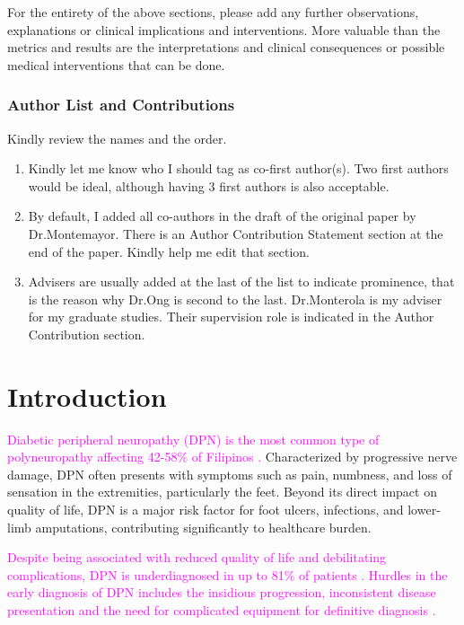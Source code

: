 \documentclass[fleqn,10pt]{wlscirep}
\begin{document}
For the entirety of the above  sections, please add any further observations, explanations or clinical implications and interventions. More valuable than the metrics and results are the interpretations and clinical consequences or possible medical interventions that can be done.

\subsubsection*{Author List and Contributions}
Kindly review the names and the order. 
\begin{enumerate}
    \item Kindly let me know who I should tag as co-first author(s). Two first authors would be ideal, although having 3 first authors is also acceptable. 
    \item By default, I added all co-authors in the draft of the original paper by Dr.Montemayor. There is an Author Contribution Statement section at the end of the paper. Kindly help me edit that section.
    \item Advisers are usually added at the last of the list to indicate prominence, that is the reason why Dr.Ong is second to the last.  Dr.Monterola is my adviser for my graduate studies. Their supervision role is indicated in the Author Contribution section.
\end{enumerate}

\section*{Introduction}
\textcolor{magenta}{Diabetic peripheral neuropathy (DPN) is the most common type of polyneuropathy affecting 42-58\% of Filipinos \cite{ropper2019adams, araneta2006hyperglycemia, dagang2016validation}.
}
Characterized by progressive nerve damage, DPN often presents with symptoms such as pain, numbness, and loss of sensation in the extremities, particularly the feet. Beyond its direct impact on quality of life, DPN is a major risk factor for foot ulcers, infections, and lower-limb amputations, contributing significantly to healthcare burden.

\textcolor{magenta}{Despite being associated with reduced quality of life and debilitating complications,
DPN is underdiagnosed in up to 81\% of patients \cite{vinik2012neuropathy, ziegler2018painful}. Hurdles in the early diagnosis of DPN includes the insidious progression, inconsistent disease presentation and the need for complicated equipment for definitive diagnosis \cite{vinik2012neuropathy, ziegler2018painful, casellini2013sudoscan}.
}
\end{document}
